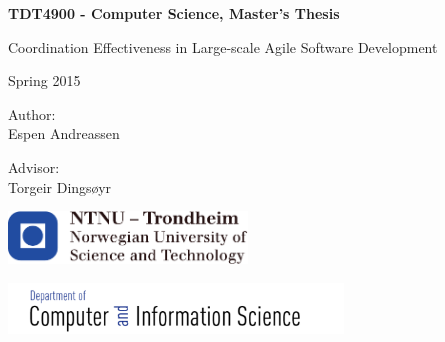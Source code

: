 \documentclass[12pt,a4paper,twoside,openright]{report}
\begin{document}

\thispagestyle{empty}

\begin{center}
    {\Huge\textbf{TDT4900 - Computer Science, Master's Thesis}} \\
    \medskip


    {\huge Coordination Effectiveness in Large-scale Agile Software Development}

    \vspace{6cm}

    {\large Spring 2015}\\

    \vspace{0.5cm}

    {\Large Author:}\\
    {\large
    Espen Andreassen\\
    }

    \vspace{0.5cm}

    {\large
    Advisor:\\
    Torgeir Dingsøyr\\}

    \vspace{6cm}

    \includegraphics[trim = 2mm 0mm 0mm 0mm, width=2.5in]{images/logo-ntnu.pdf}

    \includegraphics[trim = 0mm 0mm 16mm 0mm, width=3.5in]{images/idi.pdf}

\end{center}

\newpage

\cleardoublepage

\cleardoublepage

\cleardoublepage
{}


\setcounter{tocdepth}{1}
\dominitoc
\dominilof
\dominilot
\tableofcontents
\clearpage
\listoffigures
\listoftables













\end{document}

